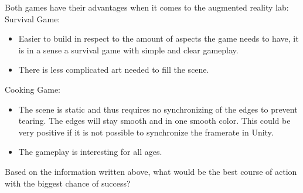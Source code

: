 \documentclass[10pt,a4paper]{article}
\begin{document}
Both games have their advantages when it comes to the augmented reality lab:
\newpage
Survival Game:
\begin{itemize}
\item Easier to build in respect to the amount of aspects the game needs to have, it is in a sense a survival game with simple and clear gameplay.
\item There is less complicated art needed to fill the scene.
\end{itemize}

Cooking Game:
\begin{itemize}
\item The scene is static and thus requires no synchronizing of the edges to prevent tearing. The edges will stay smooth and in one smooth color. This could be very positive if it is not possible to synchronize the framerate in Unity.
\item The gameplay is interesting for all ages.
\end{itemize}

Based on the information written above, what would be the best course of action with the biggest chance of success?
\end{document}

